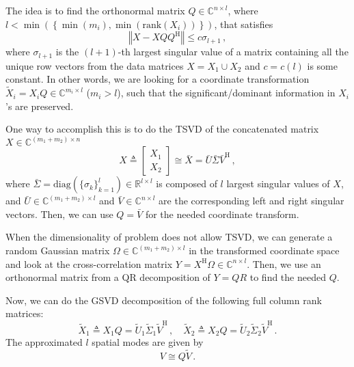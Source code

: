 \documentclass[10pt]{article}
\newcommand{\norm}[1]{\left\Vert#1\right\Vert}
\begin{document}
The idea is to find the orthonormal matrix $Q\in\mathbb{C}^{n\times l}$, where $l<\min\left(\left\{\min(m_i), \min(\mathrm{rank}(X_i))\right\}\right)$, that satisfies
\begin{equation}
    \norm{X- XQQ^\mathrm{H}} \le c \sigma_{l+1}\,,
\end{equation}
where $\sigma_{l+1}$ is the $(l+1)$-th largest singular value of a matrix containing all the unique row vectors from the data matrices
$X=X_1\cup X_2$ and $c = c(l)$ is some constant.
In other words, we are looking for a coordinate transformation $\tilde X_i = X_i Q\in \mathbb{C}^{m_i\times l}$ ($m_i > l$), such that the significant/dominant information in $X_i$'s are preserved. 

One way to accomplish this is to do the TSVD of the concatenated matrix $X \in \mathbb{C}^{(m_1+m_2)\times n}$
\begin{equation}
    X \triangleq \left[ \begin{matrix}
        X_1\\
        X_2
    \end{matrix} \right]\cong \bar X = \bar U \bar \Sigma \bar V^\mathrm{H}\,,
\end{equation}
where $\bar \Sigma=\mathrm{diag}\left(\{\sigma_k\}_{k=1}^l\right)\in \mathbb{R}^{l\times l}$ is composed of $l$ largest singular values of $X$, and $\bar U\in \mathbb{C}^{(m_1+m_2)\times l}$ and $\bar V\in \mathbb{C}^{n\times l}$ are the corresponding left and right singular vectors. Then, we can use $Q = \bar V$ for the needed coordinate transform.

When the dimensionality of problem does not allow TSVD, we can generate a random Gaussian matrix $\Omega \in \mathbb{C}^{(m_1+m_2)\times l}$ in the transformed coordinate space and look at the cross-correlation matrix %
$Y=X^\mathrm{H}\Omega \in \mathbb{C}^{n\times l}$.
Then, we use an orthonormal matrix from a QR decomposition of $Y=QR$ to find the needed $Q$. 

Now, we can do the GSVD decomposition of the following full column rank matrices:
\begin{equation}
    \tilde X_1 \triangleq X_1Q = \tilde U_1  \tilde \Sigma_{1} \tilde V^\mathrm{H}\,, \quad \tilde X_2 \triangleq X_2Q = \tilde U_2 \tilde \Sigma_{2} \tilde V^\mathrm{H}\,.
\end{equation}
The approximated $l$ spatial modes are given by
\begin{equation}
    {V} \cong Q \tilde V\,.
\end{equation}
\end{document}
